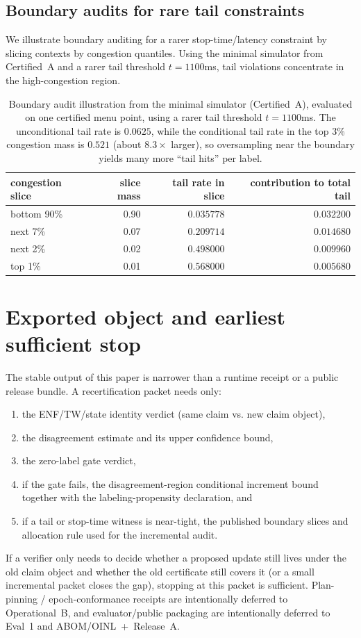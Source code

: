 \documentclass[11pt]{article}
\begin{document}
\subsection{Boundary audits for rare tail constraints}
We illustrate boundary auditing for a rarer stop-time/latency constraint by slicing contexts by congestion quantiles.
Using the minimal simulator from Certified~A and a rarer tail threshold $t=1100$ms, tail violations concentrate in the high-congestion region.

\begin{table}[t]
\centering
\begin{tabular}{@{}lrrr@{}}
\toprule
congestion slice & slice mass & tail rate in slice & contribution to total tail \\
\midrule
bottom 90\% & 0.90 & $0.035778$ & $0.032200$ \\
next 7\% & 0.07 & $0.209714$ & $0.014680$ \\
next 2\% & 0.02 & $0.498000$ & $0.009960$ \\
top 1\% & 0.01 & $0.568000$ & $0.005680$ \\
\bottomrule
\end{tabular}
\caption{Boundary audit illustration from the minimal simulator (Certified~A), evaluated on one certified menu point, using a rarer tail threshold $t=1100$ms.
The unconditional tail rate is $0.0625$, while the conditional tail rate in the top 3\% congestion mass is $0.521$ (about $8.3\times$ larger), so oversampling near the boundary yields many more ``tail hits'' per label.}
\label{tab:boundary-sim}
\end{table}

\section{Exported object and earliest sufficient stop}
The stable output of this paper is narrower than a runtime receipt or a public release bundle.
A recertification packet needs only:
\begin{enumerate}[leftmargin=*]
  \item the ENF/TW/state identity verdict (same claim vs. new claim object),
  \item the disagreement estimate and its upper confidence bound,
  \item the zero-label gate verdict,
  \item if the gate fails, the disagreement-region conditional increment bound together with the labeling-propensity declaration, and
  \item if a tail or stop-time witness is near-tight, the published boundary slices and allocation rule used for the incremental audit.
\end{enumerate}
If a verifier only needs to decide whether a proposed update still lives under the old claim object and whether the old certificate still covers it (or a small incremental packet closes the gap), stopping at this packet is sufficient.
Plan-pinning / epoch-conformance receipts are intentionally deferred to Operational~B, and evaluator/public packaging are intentionally deferred to Eval~1 and ABOM/OINL~+~Release~A.\cite{series:operationalB,series:eval1,series:releaseA}
\end{document}
